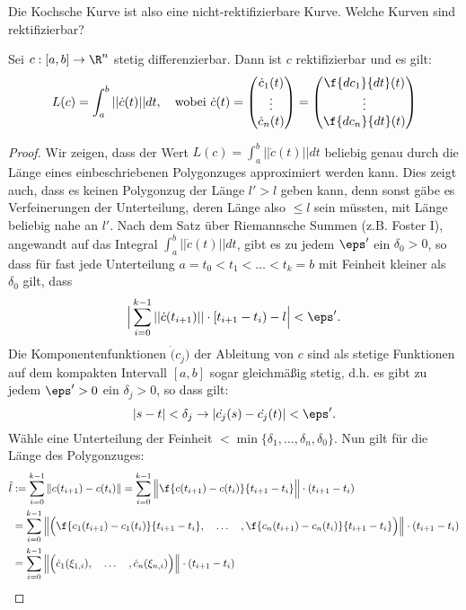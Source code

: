\documentclass{mycourse}
\begin{document}
Die Kochsche Kurve ist also eine nicht-rektifizierbare Kurve. Welche Kurven sind rektifizierbar?

\begin{st}
\label{1.5}
Sei $c: [a,b] \to \R^n$ stetig differenzierbar. Dann ist $c$ rektifizierbar und es gilt:
\[ 
	L(c) = \int_a^b ||\dot{c} (t)|| dt , \quad \text{wobei } \dot{c} (t) = \begin{pmatrix} \dot c_1(t) \\ \vdots \\ \dot c_n(t) \end{pmatrix} = \begin{pmatrix} \f{dc_1}{dt} (t) \\ \vdots \\  \f{dc_n}{dt} (t) \end{pmatrix}
\]
\begin{proof}
Wir zeigen, dass der Wert $L(c) = \int_a^b ||\dot{c} (t)|| dt$ beliebig genau durch die Länge eines einbeschriebenen Polygonzuges approximiert werden kann. Dies zeigt auch, dass es keinen Polygonzug der Länge $l' > l$ geben kann, denn sonst gäbe es Verfeinerungen der Unterteilung, deren Länge also $\le l$ sein müssten, mit Länge beliebig nahe an $l'$. Nach dem Satz über Riemannsche Summen (z.B. Foster I), angewandt auf das Integral $\int_a^b ||\dot{c} (t)|| dt$, gibt es zu jedem $\eps'$ ein $\delta_0> 0$, so dass für fast jede Unterteilung $a = t_0 < t_1 < \dots < t_k = b$ mit Feinheit kleiner als $\delta_0$ gilt, dass
\[ \Big | \sum_{i=0}^{k-1} ||\dot{c} (t_{i+1})|| \cdot [t_{i+1} - t_i) - l\Big | < \eps'. \]
Die Komponentenfunktionen $\dot(c_j)$ der Ableitung von $c$ sind als stetige Funktionen auf dem kompakten Intervall $[a,b]$ sogar gleichmäßig stetig, d.h. es gibt zu jedem $\eps' > 0$ ein $\delta_j > 0$, so dass gilt:
\[ |s - t| < \delta_j  \rightarrow |\dot{c_j}(s) - \dot{c_j}(t)| < \eps' .\]
Wähle eine Unterteilung der Feinheit $< \min \{ \delta_1, \dots, \delta_n, \delta_0 \}$. Nun gilt für die Länge des Polygonzuges:
\begin{align*}
 \hat l &:= \sum_{i=0}^{k-1} \|c(t_{i+1}) - c(t_i)\|  = \sum_{i=0}^{k-1} \Big \|  \f{c(t_{i+1}) - c(t_i)}{t_{i+1}-t_i} \Big \| \cdot (t_{i+1} - t_i) \\
 &= \sum_{i=0}^{k-1} \Big \| \Big (  \f{c_1(t_{i+1}) - c_1(t_i)}{t_{i+1}-t_i}, \quad \dots \quad , \f{c_n(t_{i+1}) - c_n(t_i)}{t_{i+1}-t_i} \Big ) \Big \| \cdot (t_{i+1} - t_i) \\
 &= \sum_{i=0}^{k-1} \Big \| \Big (  \dot c_1(\xi_{1,i}), \quad \dots \quad , \dot c_n(\xi_{n,i}) \Big ) \Big \| \cdot (t_{i+1} - t_i)

\end{align*}
\end{proof}
\end{st}
\end{document}
